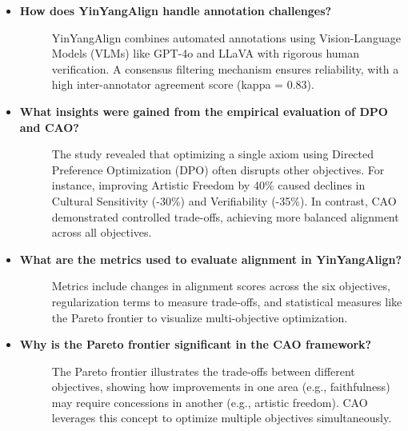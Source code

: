\begin{itemize}[leftmargin=15pt,nolistsep]
\item[\ding{93}] { \selectfont \textbf{How does YinYangAlign handle annotation challenges?}}
\vspace{0mm}
\begin{description}
\item[] YinYangAlign combines automated annotations using Vision-Language Models (VLMs) like GPT-4o and LLaVA with rigorous human verification. A consensus filtering mechanism ensures reliability, with a high inter-annotator agreement score (kappa = 0.83).
\end{description}

\item[\ding{93}] { \selectfont \textbf{What insights were gained from the empirical evaluation of DPO and CAO?}}
\vspace{0mm}
\begin{description}
\item[] The study revealed that optimizing a single axiom using Directed Preference Optimization (DPO) often disrupts other objectives. For instance, improving Artistic Freedom by 40\% caused declines in Cultural Sensitivity (-30\%) and Verifiability (-35\%). In contrast, CAO demonstrated controlled trade-offs, achieving more balanced alignment across all objectives.
\end{description}

\item[\ding{93}] { \selectfont \textbf{What are the metrics used to evaluate alignment in YinYangAlign?}}
\vspace{0mm}
\begin{description}
\item[] Metrics include changes in alignment scores across the six objectives, regularization terms to measure trade-offs, and statistical measures like the Pareto frontier to visualize multi-objective optimization.
\end{description}

\item[\ding{93}] { \selectfont \textbf{Why is the Pareto frontier significant in the CAO framework?}}
\vspace{0mm}
\begin{description}
\item[] The Pareto frontier illustrates the trade-offs between different objectives, showing how improvements in one area (e.g., faithfulness) may require concessions in another (e.g., artistic freedom). CAO leverages this concept to optimize multiple objectives simultaneously.
\end{description}


\end{itemize}
